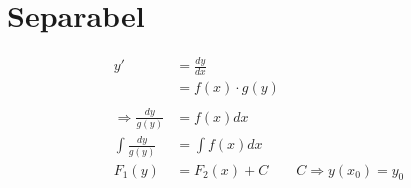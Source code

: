 \section{Separabel}
\begin{align*}[box=\widebox]
y' &= \frac{d y}{d x} \\
&= f(x)\cdot g(y)\\\\
\Rightarrow \frac{d y}{g(y)} &= f(x)d x\\
\int{\frac{d y}{g(y)}} &= \int{f(x)d x}\\
F_{1}(y) &= F_{2}(x)+C \qquad C\Rightarrow y(x_{0}) = y_{0}
\end{align*}